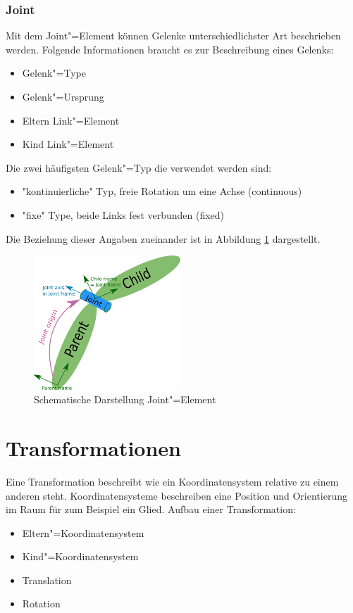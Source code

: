 \subsubsection*{Joint}
Mit dem Joint"=Element können Gelenke unterschiedlichster Art beschrieben werden.
Folgende Informationen braucht es zur Beschreibung eines Gelenks:
\begin{itemize}
\item Gelenk"=Type
\item Gelenk"=Ursprung
\item Eltern Link"=Element
\item Kind Link"=Element
\end{itemize}
Die zwei häufigsten Gelenk"=Typ die verwendet werden sind:
\begin{itemize}
\item \textsc{"}kontinuierliche\textsc{"} Typ, freie Rotation um eine Achse (continuous)
\item \textsc{"}fixe\textsc{"} Type, beide Links fest verbunden (fixed)
\end{itemize} 
Die Beziehung dieser Angaben  zueinander ist in Abbildung \ref{Ab:aufbaut-joint} dargestellt.
\begin{figure}[ht!]
	\centering
	\includegraphics[width=5.5cm]{images/urdf_joint.png}
	\caption{Schematische Darstellung Joint"=Element \cite{ros}}
	\label{Ab:aufbaut-joint}
\end{figure}




\section{Transformationen} %
\label{chap:transformationen}
Eine Transformation beschreibt wie ein Koordinatensystem relative zu einem anderen steht.
Koordinatensysteme beschreiben eine Position und Orientierung im Raum für zum Beispiel ein Glied.
Aufbau einer Transformation:
\begin{itemize}
\item Eltern"=Koordinatensystem
\item Kind"=Koordinatensystem
\item Translation
\item Rotation
\end{itemize}


